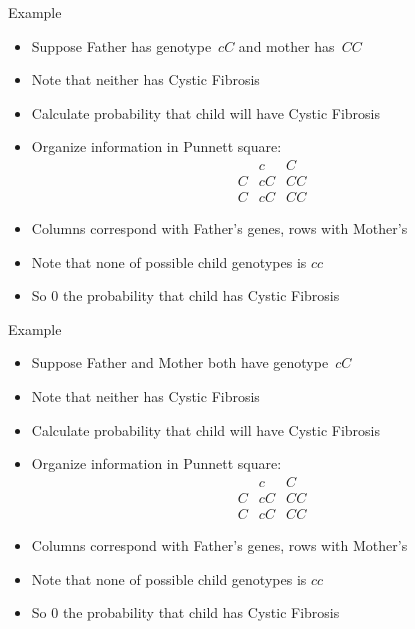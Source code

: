 \documentclass[handout]{beamer}
\theoremstyle{definition}
\begin{document}
\begin{frame}{Example}
\begin{itemize}
\item Suppose Father has genotype~$cC$ and mother has~$CC$
\item Note that neither has Cystic Fibrosis
\item Calculate probability that child will have Cystic Fibrosis
\item Organize information in \alert{Punnett square}:
\[\begin{array}{c|cc}
&c&C\\\hline
C&cC&CC\\
C&cC&CC
\end{array}\]
\item Columns correspond with Father's genes, rows with Mother's
\item Note that \alert{none} of possible child genotypes is $cc$
\item So $0$ the probability that child has Cystic Fibrosis
\end{itemize}
\end{frame}

\begin{frame}{Example}
\begin{itemize}
\item Suppose Father and Mother both have genotype~$cC$
\item Note that neither has Cystic Fibrosis
\item Calculate probability that child will have Cystic Fibrosis
\item Organize information in \alert{Punnett square}:
\[\begin{array}{c|cc}
&c&C\\\hline
C&cC&CC\\
C&cC&CC
\end{array}\]
\item Columns correspond with Father's genes, rows with Mother's
\item Note that \alert{none} of possible child genotypes is $cc$
\item So $0$ the probability that child has Cystic Fibrosis
\end{itemize}
\end{frame}
\end{document}
